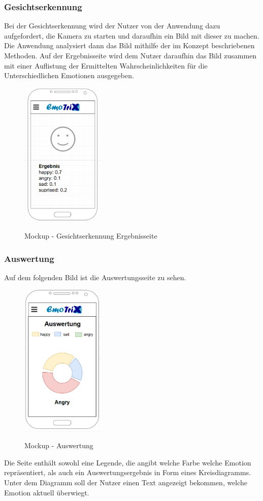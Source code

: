 \subsubsection{Gesichtserkennung}
Bei der Gesichtserkennung wird der Nutzer von der Anwendung dazu aufgefordert, die Kamera zu starten und daraufhin ein Bild mit dieser zu machen. Die Anwendung analysiert dann das Bild mithilfe der im Konzept beschriebenen Methoden. Auf der Ergebnisseite wird dem Nutzer daraufhin das Bild zusammen mit einer Auflistung der Ermittelten Wahrscheinlichkeiten für die Unterschiedlichen Emotionen ausgegeben.
\begin{figure}[h]
	\centering
	\includegraphics[width=4cm]{Bilder/Mockup-Gesichtserkennung.png}
	\label{img:Mockup-Gesichtserkennung}
	\caption[Mockup - Gesichtserkennung Ergebnisseite]{Mockup - Gesichtserkennung Ergebnisseite}
\end{figure} \newpage
\subsubsection{Auswertung}
Auf dem folgenden Bild ist die Auswertungsseite zu sehen. 
\begin{figure}[h]
	\centering
	\includegraphics[width=4cm]{Bilder/Mockup-Auswertung.png}
	\label{img:Mockup-Auswertung}
	\caption[Mockup - Auswertung]{Mockup - Auswertung}
\end{figure} \newline
Die Seite enthält sowohl eine Legende, die angibt welche Farbe welche Emotion repräsentiert, als auch ein Auswertungsergebnis in Form eines Kreisdiagramms. Unter dem Diagramm soll der Nutzer einen Text angezeigt bekommen, welche Emotion aktuell überwiegt.
